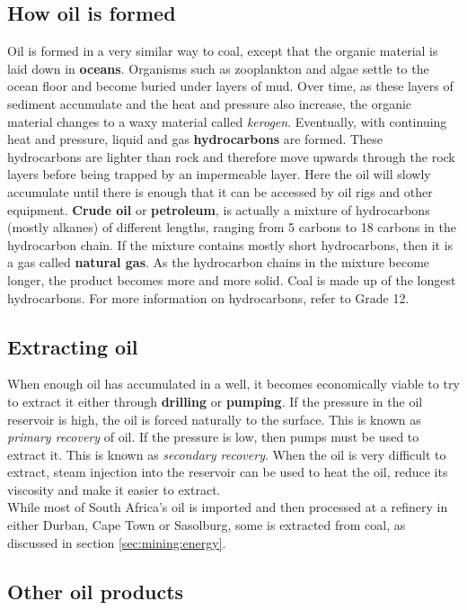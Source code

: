\subsection{How oil is formed}

Oil is formed in a very similar way to coal, except that the organic material is laid down in \textbf{oceans}. Organisms such as zooplankton and algae settle to the ocean floor and become buried under layers of mud. Over time, as these layers of sediment accumulate and the heat and pressure also increase, the organic material changes to a waxy material called \textit{kerogen}. Eventually, with continuing heat and pressure, liquid and gas \textbf{hydrocarbons} are formed. These hydrocarbons are lighter than rock and therefore move upwards through the rock layers before being trapped by an impermeable layer. Here the oil will slowly accumulate until there is enough that it can be accessed by oil rigs and other equipment. \textbf{Crude oil} or \textbf{petroleum}, is actually a mixture of hydrocarbons (mostly alkanes) of different lengths, ranging from 5 carbons to 18 carbons in the hydrocarbon chain. If the mixture contains mostly short hydrocarbons, then it is a gas called \textbf{natural gas}. As the hydrocarbon chains in the mixture become longer, the product becomes more and more solid. Coal is made up of the longest hydrocarbons. For more information on hydrocarbons, refer to Grade 12.

\subsection{Extracting oil}

When enough oil has accumulated in a well, it becomes economically viable to try to extract it either through \textbf{drilling} or \textbf{pumping}. If the pressure in the oil reservoir is high, the oil is forced naturally to the surface. This is known as \textit{primary recovery} of oil. If the pressure is low, then pumps must be used to extract it. This is known as \textit{secondary recovery}. When the oil is very difficult to extract, steam injection into the reservoir can be used to heat the oil, reduce its viscosity and make it easier to extract.\\

While most of South Africa's oil is imported and then processed at a refinery in either Durban, Cape Town or Sasolburg, some is extracted from coal, as discussed in section \ref{sec:mining:energy}.


\subsection{Other oil products}

